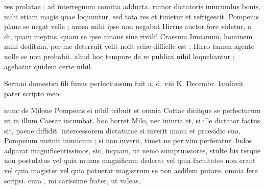  res prolatae ; ad interregnum comitia adducta. rumor dictatoris iniucundus bonis, mihi etiam magis quae loquuntur. sed tota res et timetur et refrigescit. Pompeius plane se negat velle ; antea mihi ipse non negabat Hirrus auctor fore videtur, o di, quam ineptus, quam se ipse amans sine rivali! Crassum Iunianum, hominem mihi deditum, per me deterruit velit nolit scire difficile est ; Hirro tamen agente nolle se non probabit. aliud hoc tempore de re publica nihil loquebantur ; agebatur quidem certe nihil.

 Serrani domestici fili funus perluctuosum fuit a. d. viii K. Decembr. laudavit pater scripto meo.

 nunc de Milone Pompeius ei nihil tribuit et omnia Cottae dicitque se perfecturum ut in illum Caesar incumbat. hoc horret Milo, nec iniuria et, si ille dictator factus sit, paene diffidit. intercessorem dictaturae si iuverit manu et praesidio suo, Pompeium metuit inimicum ; si non iuverit, timet ne per vim perferatur. ludos adparat magnificentissimos, sic, inquam, ut nemo sumptuosiores, stulte bis terque non postulatos vel quia munus magnificum dederat vel quia facultates non erant vel quia magister vel quia potuerat magistrum se non aedilem putare. omnia fere scripsi. cura , mi carissime frater, ut valeas.
